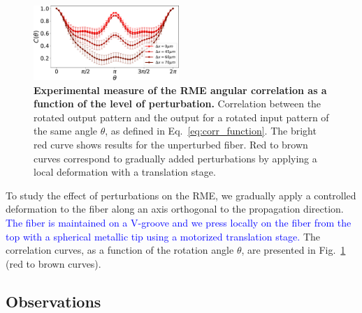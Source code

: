 \documentclass[aps,prl,twocolumn, amsmath,amssymb,superscriptaddress]{revtex4-2}
\newcommand{\blue}[1]{\textcolor{blue}{#1}}
\begin{document}
\begin{figure}[ht]
\includegraphics[width=0.49\textwidth]{images/Fig2.pdf}
\caption{
\textbf{Experimental measure of the RME angular correlation as a function of the level of perturbation.}
    Correlation between the rotated output pattern and the output for a rotated input pattern of the same angle $\theta$, 
    as defined in Eq.~\ref{eq:corr_function}. 
    The bright red curve shows results for the unperturbed fiber.
    Red to brown curves correspond to gradually added perturbations 
    by applying a local deformation with a translation stage.
}
\label{fig:correlation}
\end{figure}


To study the effect of perturbations on the RME, 
we gradually apply a controlled deformation to the fiber 
along an axis orthogonal to the propagation direction. 
\blue{
    The fiber is maintained on a V-groove and we press locally on the fiber from the top
    with a spherical metallic tip using a motorized translation stage.
}
The correlation curves, as a function of the rotation angle $\theta$, 
are presented in Fig.~\ref{fig:correlation} (red to brown curves). 


\subsection{Observations}

\end{document}
